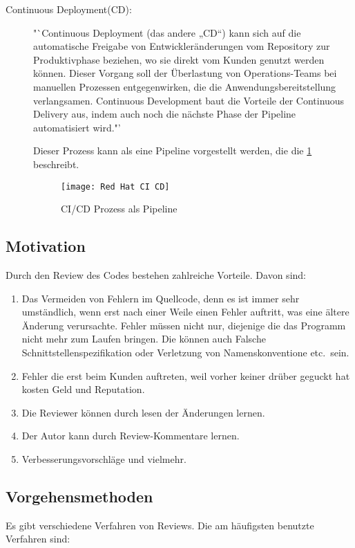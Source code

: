 \begin{description}
	\item [Continuous Deployment(CD):]
		"`Continuous Deployment (das andere „CD“) kann sich auf die automatische Freigabe von Entwickleränderungen vom Repository zur Produktivphase beziehen, wo sie direkt vom Kunden 			genutzt werden können. Dieser Vorgang soll der Überlastung von Operations-Teams bei manuellen Prozessen entgegenwirken, die die Anwendungsbereitstellung verlangsamen. Continuous 		Development baut die Vorteile der Continuous Delivery aus, indem auch noch die nächste Phase der Pipeline automatisiert wird."' \cite{RedHat}

	Dieser Prozess kann als eine Pipeline vorgestellt werden, die die \cref{fig:RedHat} beschreibt.
	\begin{figure}[H]
		\centering
		\texttt{[image: Red Hat CI CD]}
		\caption[\ac{CI}/\ac{CD}]{\ac{CI}/\ac{CD} Prozess als Pipeline\\ \cite{RedHat}}
		\label{fig:RedHat}
	\end{figure}
	
\end{description}

\subsection{Motivation}
\label{subsec:Gründe}
Durch den Review des Codes bestehen zahlreiche Vorteile. Davon sind:

\begin{enumerate}
	\item Das Vermeiden von Fehlern im Quellcode, denn es ist immer sehr umständlich, wenn erst nach einer Weile einen Fehler auftritt, was eine ältere Änderung verursachte.
		Fehler müssen nicht nur, diejenige die das Programm nicht mehr zum Laufen bringen. Die können auch Falsche Schnittstellenspezifikation oder Verletzung von Namenskonventione 
		etc.\ sein.
	\item Fehler die erst beim Kunden auftreten, weil vorher keiner drüber geguckt hat kosten Geld und Reputation.
	\item Die Reviewer können durch lesen der Änderungen lernen.
	\item Der Autor kann durch Review-Kommentare lernen.
	\item Verbesserungsvorschläge und vielmehr.
\end{enumerate}

\subsection{Vorgehensmethoden}
\label{subsec:Vorgehensmethoden}
Es gibt verschiedene Verfahren von Reviews. Die am häufigsten benutzte Verfahren sind:

